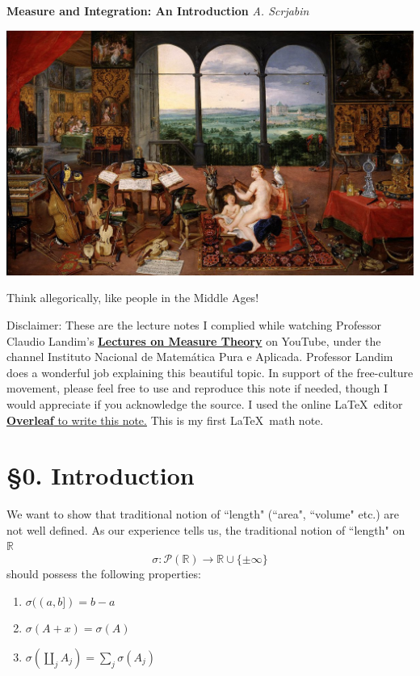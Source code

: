 \documentclass[hidelinks]{article}
\theoremstyle{definition}
\theoremstyle{dotless}
\theoremstyle{remark}
\begin{document}
\begin{titlepage}
   \begin{center}
      \LARGE\textbf{Measure and Integration: An Introduction}\medbreak
      \Large\textsl{A. Scrjabin}\bigbreak
      \centerline{\href{https://en.wikipedia.org/wiki/The_Five_Senses_(series)}{\includegraphics[width=0.7\linewidth]{titlepage.jpg}}}
      \normalsize{Think allegorically, like people in the Middle Ages!}
      \end{center}
  \tableofcontents
   \bigbreak\bigbreak
   Disclaimer: These are the lecture notes I complied while watching Professor Claudio Landim's \href{https://www.youtube.com/playlist?list=PLo4jXE-LdDTQq8ZyA8F8reSQHej3F6RFX}{\textbf{Lectures on Measure Theory}} on YouTube, under the channel Instituto Nacional de Matemática Pura e Aplicada. Professor Landim does a wonderful job explaining this beautiful topic. In support of the free-culture movement, please feel free to use and reproduce this note if needed, though I would appreciate if you acknowledge the source. I used the online \LaTeX\  editor \href{https://www.overleaf.com}{\textbf{Overleaf} to write this note.} This is my first \LaTeX\ math note.
\end{titlepage}

\section*{\S0. Introduction}
\setcounter{section}{0}

We want to show that traditional notion of ``length" (``area", ``volume" etc.) are not well defined. \bigbreak
As our experience tells us, the traditional notion of ``length" on $\mathbb{R}$
\[
\sigma: \mathscr{P}(\mathbb{R})\to \mathbb{R}\cup\{\pm\infty\}
\]
should possess the following properties:
\begin{enumerate}[label=\arabic*\degree]
    \item $\sigma((a,b])=b-a$
    \item $\sigma(A+x)=\sigma(A)$
    \item $\sigma(\coprod\limits_jA_j)=\sum\limits_j\sigma(A_j)$
\end{enumerate}
\end{document}
